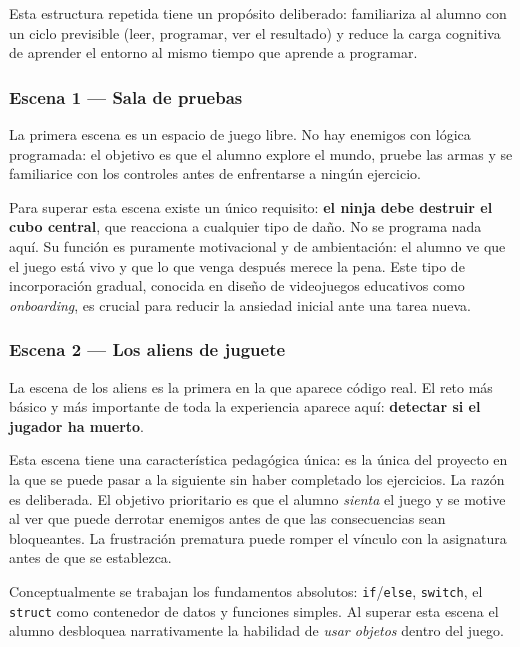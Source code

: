 \documentclass[a4paper,12pt]{article}
\begin{document}
Esta estructura repetida tiene un propósito deliberado: familiariza al alumno con un
ciclo previsible (leer, programar, ver el resultado) y reduce la carga cognitiva de
aprender el entorno al mismo tiempo que aprende a programar.

\subsubsection{Escena 1 — Sala de pruebas}

La primera escena es un espacio de juego libre. No hay enemigos con lógica programada:
el objetivo es que el alumno explore el mundo, pruebe las armas y se familiarice con
los controles antes de enfrentarse a ningún ejercicio.

Para superar esta escena existe un único requisito: \textbf{el ninja debe destruir el
cubo central}, que reacciona a cualquier tipo de daño. No se programa nada aquí. Su
función es puramente motivacional y de ambientación: el alumno ve que el juego está
vivo y que lo que venga después merece la pena. Este tipo de incorporación gradual,
conocida en diseño de videojuegos educativos como \textit{onboarding}, es crucial para
reducir la ansiedad inicial ante una tarea nueva.

\hypertarget{esc2}{\subsubsection{Escena 2 — Los aliens de juguete}}

La escena de los aliens es la primera en la que aparece código real. El reto más
básico y más importante de toda la experiencia aparece aquí: \textbf{detectar si el
jugador ha muerto}.

Esta escena tiene una característica pedagógica única: es la única del proyecto en
la que se puede pasar a la siguiente sin haber completado los ejercicios. La razón
es deliberada. El objetivo prioritario es que el alumno \textit{sienta} el juego y
se motive al ver que puede derrotar enemigos antes de que las consecuencias sean
bloqueantes. La frustración prematura puede romper el vínculo con la asignatura
antes de que se establezca.

Conceptualmente se trabajan los fundamentos absolutos: \texttt{if}/\texttt{else},
\texttt{switch}, el \texttt{struct} como contenedor de datos y funciones simples.
Al superar esta escena el alumno desbloquea narrativamente la habilidad de
\textit{usar objetos} dentro del juego.
\end{document}
